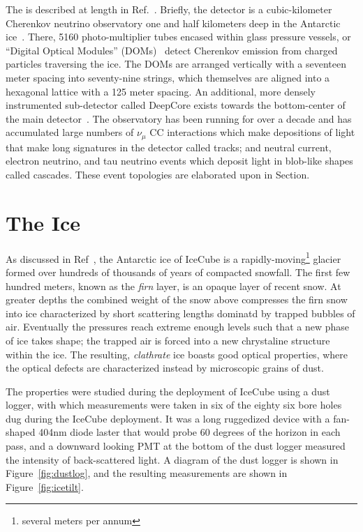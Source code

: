 \documentclass[main.tex]{subfiles}
\begin{document}
The  is described at length in Ref.~\cite{Aartsen_2017}. Briefly, the detector is a cubic-kilometer Cherenkov neutrino observatory one and half kilometers deep in the Antarctic ice~\cite{Aartsen_2017}.
There, 5160 photo-multiplier tubes encased within glass pressure vessels, or ``Digital Optical Modules'' (DOMs)~\cite{ABBASI2009294} detect Cherenkov emission from charged particles traversing the ice.
The DOMs are arranged vertically with a seventeen meter spacing into seventy-nine strings, which themselves are aligned into a hexagonal lattice with a 125 meter spacing. 
An additional, more densely instrumented sub-detector called DeepCore exists towards the bottom-center of the main detector~\cite{ABBASI2012615}.
The observatory has been running for over a decade and has accumulated large numbers of $\nu_{\mu}$ CC interactions which make depositions of light that make long signatures in the detector called tracks; and neutral current, electron neutrino, and tau neutrino events which deposit light in blob-like shapes called cascades. These event topologies are elaborated upon in Section. %

\section{The Ice}
As discussed in Ref~\cite{journal_glaciology_2013}, the Antarctic ice of IceCube is a rapidly-moving\footnote{several meters per annum} glacier formed over hundreds of thousands of years of compacted snowfall. 
The first few hundred meters, known as the \textit{firn} layer, is an opaque layer of recent snow. 
At greater depths the combined weight of the snow above compresses the firn snow into ice characterized by short scattering lengths dominatd by trapped bubbles of air.
Eventually the pressures reach extreme enough levels such that a new phase of ice takes shape; the trapped air is forced into a new chrystaline structure within the ice. 
The resulting, \textit{clathrate} ice boasts good optical properties, where the optical defects are characterized instead by microscopic grains of dust. 

The properties were studied during the deployment of IceCube using a dust logger, with which measurements were taken in six of the eighty six bore holes dug during the IceCube deployment. 
It was a long ruggedized device with a fan-shaped 404nm diode laster that would probe 60 degrees of the horizon in each pass, and a downward looking PMT at the bottom of the dust logger measured the intensity of back-scattered light. 
A diagram of the dust logger is shown in Figure~\ref{fig:dustlog}, and the resulting measurements are shown in Figure~\ref{fig:icetilt}.
\end{document}
